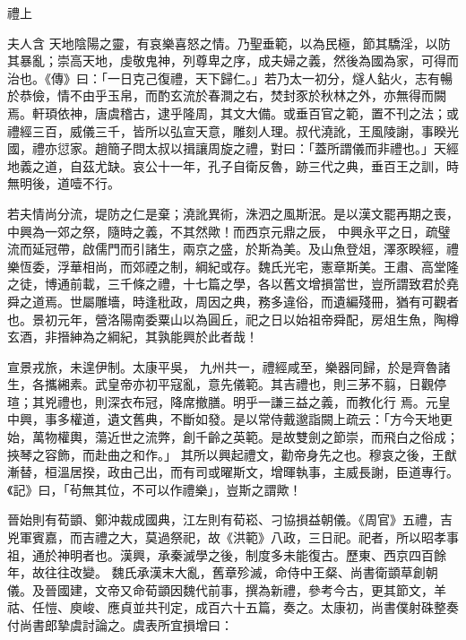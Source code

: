 
\begin{pinyinscope}

 禮上



 夫人含
 天地陰陽之靈，有哀樂喜怒之情。乃聖垂範，以為民極，節其驕淫，以防其暴亂；崇高天地，虔敬鬼神，列尊卑之序，成夫婦之義，然後為國為家，可得而治也。《傳》曰：「一日克己復禮，天下歸仁。」若乃太一初分，燧人鉆火，志有暢於恭儉，情不由乎玉帛，而酌玄流於春澗之右，焚封豕於秋林之外，亦無得而闕焉。軒頊依神，唐虞稽古，逮乎隆周，其文大備。或垂百官之範，置不刊之法；或禮經三百，威儀三千，皆所以弘宣天意，雕刻人理。叔代澆訛，王風陵謝，事睽光國，禮亦愆家。趙簡子問太叔以揖讓周旋之禮，對曰：「蓋所謂儀而非禮也。」天經地義之道，自茲尤缺。哀公十一年，孔子自衛反魯，跡三代之典，垂百王之訓，時無明後，道噎不行。



 若夫情尚分流，堤防之仁是棄；澆訛異術，洙泗之風斯泯。是以漢文罷再期之喪，中興為一郊之祭，隨時之義，不其然歟！而西京元鼎之辰，
 中興永平之日，疏璧流而延冠帶，啟儒門而引諸生，兩京之盛，於斯為美。及山魚登俎，澤豕睽經，禮樂恆委，浮華相尚，而郊禋之制，綱紀或存。魏氏光宅，憲章斯美。王肅、高堂隆之徒，博通前載，三千條之禮，十七篇之學，各以舊文增損當世，豈所謂致君於堯舜之道焉。世屬雕墻，時逢秕政，周因之典，務多違俗，而遺編殘冊，猶有可觀者也。景初元年，營洛陽南委粟山以為圓丘，祀之日以始祖帝舜配，房俎生魚，陶樽玄酒，非搢紳為之綱紀，其孰能興於此者哉！



 宣景戎旅，未遑伊制。太康平吳，
 九州共一，禮經咸至，樂器同歸，於是齊魯諸生，各攜緗素。武皇帝亦初平寇亂，意先儀範。其吉禮也，則三茅不翦，日觀停瑄；其兇禮也，則深衣布冠，降席撤膳。明乎一謙三益之義，而教化行
 焉。元皇中興，事多權道，遺文舊典，不斷如發。是以常侍戴邈詣闕上疏云：「方今天地更始，萬物權輿，蕩近世之流弊，創千齡之英範。是故雙劍之節崇，而飛白之俗成；挾琴之容飾，而赴曲之和作。」
 其所以興起禮文，勸帝身先之也。穆哀之後，王猷漸替，桓溫居揆，政由己出，而有司或曜斯文，增暉執事，主威長謝，臣道專行。《記》曰，「茍無其位，不可以作禮樂」，豈斯之謂歟！



 晉始則有荀顗、鄭沖裁成國典，江左則有荀崧、刁協損益朝儀。《周官》五禮，吉兇軍賓嘉，而吉禮之大，莫過祭祀，故《洪範》八政，三日祀。祀者，所以昭孝事祖，通於神明者也。漢興，承秦滅學之後，制度多未能復古。歷東、西京四百餘年，故往往改變。
 魏氏承漢末大亂，舊章殄滅，命侍中王粲、尚書衛顗草創朝儀。及晉國建，文帝又命荀顗因魏代前事，撰為新禮，參考今古，更其節文，羊祜、任愷、庾峻、應貞並共刊定，成百六十五篇，奏之。太康初，尚書僕射硃整奏付尚書郎摯虞討論之。虞表所宜損增曰：




\end{pinyinscope}
